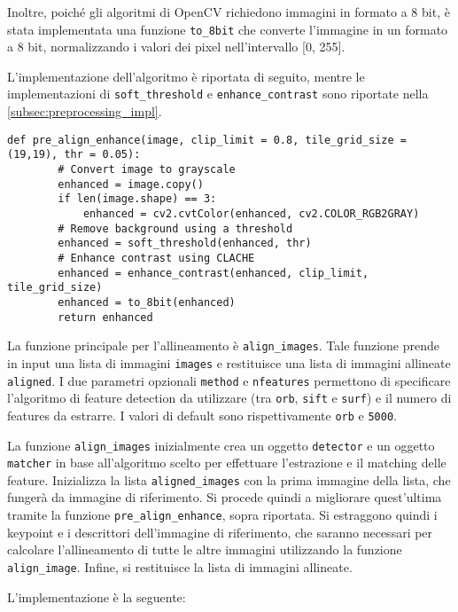 Inoltre, poiché gli algoritmi di OpenCV richiedono immagini in formato a 8 bit, è stata implementata una funzione \texttt{to\_8bit} che converte l'immagine in un formato a 8 bit, normalizzando i valori dei pixel nell'intervallo [0, 255].

L'implementazione dell'algoritmo è riportata di seguito, mentre le implementazioni di \texttt{soft\_threshold} e \texttt{enhance\_contrast}  sono riportate nella \cref{subsec:preprocessing_impl}.

\begin{lstlisting}[label={lst:pre_align_enhance}]
    def pre_align_enhance(image, clip_limit = 0.8, tile_grid_size = (19,19), thr = 0.05):
        # Convert image to grayscale
        enhanced = image.copy()
        if len(image.shape) == 3:
            enhanced = cv2.cvtColor(enhanced, cv2.COLOR_RGB2GRAY)
        # Remove background using a threshold
        enhanced = soft_threshold(enhanced, thr)
        # Enhance contrast using CLACHE
        enhanced = enhance_contrast(enhanced, clip_limit, tile_grid_size)
        enhanced = to_8bit(enhanced)
        return enhanced
\end{lstlisting}

La funzione principale per l'allineamento è \texttt{align\_images}. Tale funzione prende in input una lista di immagini \texttt{images} e restituisce una lista di immagini allineate \texttt{aligned}. I due parametri opzionali \texttt{method} e \texttt{nfeatures} permettono di specificare l'algoritmo di feature detection da utilizzare (tra \texttt{orb}, \texttt{sift} e \texttt{surf}) e il numero di features da estrarre. I valori di default sono rispettivamente \texttt{orb} e \texttt{5000}.

La funzione \texttt{align\_images} inizialmente crea un oggetto \texttt{detector} e un oggetto \texttt{matcher} in base all'algoritmo scelto per effettuare l'estrazione e il matching delle feature. Inizializza la lista \texttt{aligned\_images} con la prima immagine della lista, che fungerà da immagine di riferimento. Si procede quindi a migliorare quest'ultima tramite la funzione \texttt{pre\_align\_enhance}, sopra riportata. Si estraggono quindi i keypoint e i descrittori dell'immagine di riferimento, che saranno necessari per calcolare l'allineamento di tutte le altre immagini utilizzando la funzione \texttt{align\_image}. Infine, si restituisce la lista di immagini allineate.

L'implementazione è la seguente:

